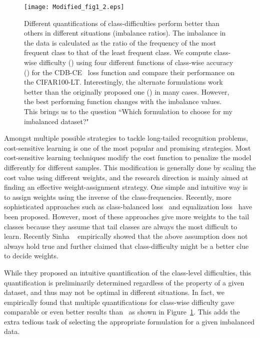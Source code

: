 \documentclass[10pt,twocolumn,letterpaper]{article}
\newcommand{\sinha}[1]{{\color{black}#1}}
\begin{document}
\begin{figure}[t]
  \centering
\texttt{[image: Modified\_fig1\_2.eps]}
  \caption{Different quantifications of class-difficulties perform better than others in different situations (imbalance ratios). The imbalance in the data is  calculated as the ratio of the frequency of the most frequent class to that of the least frequent class.
 We compute class-wise difficulty () using four different functions of class-wise accuracy () for the CDB-CE~\cite{cdb-ce} loss function and compare their performance on the CIFAR100-LT. 
 Interestingly, 
the alternate formulations work better than the originally proposed one () in many cases.
However, the best performing function changes with the imbalance values. This brings us to the question ``Which formulation to choose for my imbalanced dataset?" 
}
  \label{fig:class-wise difficulty}
\end{figure}

Amongst multiple possible strategies to tackle long-tailed recognition problems, cost-sensitive learning is one of the most popular and promising strategies.
Most cost-sensitive learning techniques modify the cost function to penalize the model differently for different samples. 
This modification is generally done by scaling the cost value using different weights, and the research direction is mainly aimed at finding an effective weight-assignment strategy. 
One simple and intuitive way is to assign weights using the inverse of the class-frequencies. 
Recently, more sophisticated approaches such as class-balanced loss~\cite{classbalancedloss} and equalization loss~\cite{eqlloss} have been proposed.
However, most of these approaches give more weights to the tail classes because they assume that tail classes are always the most difficult to learn. 
\sinha{Recently Sinha \etal~\cite{cdb-ce,sinha_ijcv}} empirically showed that the above assumption does not always hold true and further claimed that class-difficulty might be a better clue to decide weights. 

While they proposed an intuitive quantification of the class-level difficulties, 
this quantification is preliminarily determined regardless of the property of a given dataset, and thus may not be optimal in different situations.
In fact, we empirically found that multiple quantifications for class-wise difficulty gave comparable or even better results than~\cite{cdb-ce} as shown in Figure~\ref{fig:class-wise difficulty}. 
This adds the extra tedious task of selecting the appropriate formulation for a given imbalanced data. 
\end{document}
